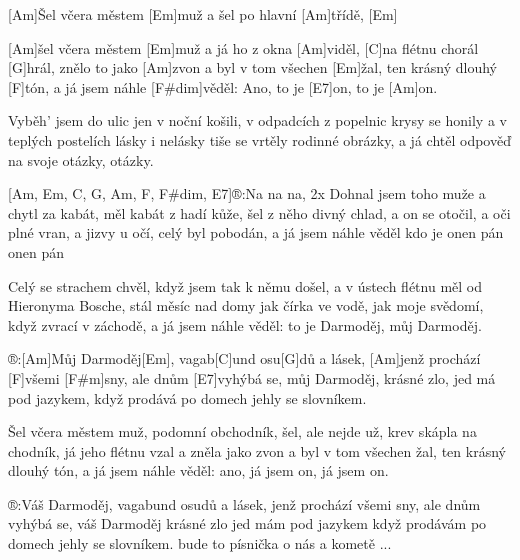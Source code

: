 
[Am]\null Šel včera městem [Em]muž 
a šel po hlavní [Am]třídě, [Em]

[Am]\null šel včera městem [Em]muž 
a já ho z okna [Am]viděl,
[C]na flétnu chorál [G]hrál, 
znělo to jako [Am]zvon
a byl v tom všechen [Em]\null žal, 
ten krásný dlouhý [F]tón,
a já jsem náhle [F#dim]věděl: 
Ano, to je [E7]on, to je [Am]on.

Vyběh' jsem do ulic jen v noční košili,
v odpadcích z popelnic krysy se honily
a v teplých postelích lásky i nelásky
tiše se vrtěly rodinné obrázky,
a já chtěl odpověď na svoje otázky, otázky.

[Am, Em, C, G, Am, F, F#dim, E7]\null®:Na na na, 2x
Dohnal jsem toho muže a chytl za kabát,
měl kabát z hadí kůže, šel z něho divný chlad,
a on se otočil, a oči plné vran,
a jizvy u očí, celý byl pobodán,
a já jsem náhle věděl kdo je onen pán onen pán
\slpc

Celý se strachem chvěl, 
když jsem tak k němu došel,
a v ústech flétnu měl od Hieronyma Bosche,
stál měsíc nad domy jak čírka ve vodě,
jak moje svědomí, když zvrací v záchodě,
a já jsem náhle věděl: 
to je Darmoděj, můj Darmoděj.

®:[Am]Můj Darmoděj[Em], 
vagab[C]und osu[G]dů a lásek,
[Am]jenž prochází [F]všemi [F#m]sny, 
ale dnům [E7]vyhýbá se,
můj Darmoděj, krásné zlo, 
jed má pod jazykem,
když prodává po domech jehly se slovníkem.

Šel včera městem muž, podomní obchodník,
šel, ale nejde už, krev skápla na chodník,
já jeho flétnu vzal a zněla jako zvon
a byl v tom všechen žal, ten krásný dlouhý tón,
a já jsem náhle věděl: 
ano, já jsem on, já jsem on.

®:Váš Darmoděj, vagabund osudů a lásek,
jenž prochází všemi sny, ale dnům vyhýbá se,
váš Darmoděj krásné zlo jed mám pod jazykem
když prodávám po domech jehly se slovníkem.
bude to písnička o nás a kometě ...